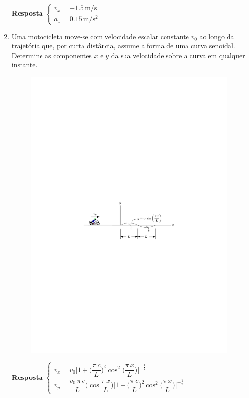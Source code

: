 \documentclass[a4paper,12pt]{article}
\begin{document}
\begin{enumerate}
		\textbf{Resposta}
		$
		\begin{cases}
		v_{x}=\SI{-1.5}{\meter/\second}\\
		a_{x}=\SI{0.15}{\meter/\second^{2}}
		\end{cases}
		$
		
		\item Uma motocicleta move-se com velocidade escalar constante $v_{0}$ ao longo da trajetória que, por curta distância, assume a forma de uma curva senoidal. Determine as componentes $x$ e $y$ da sua velocidade
		sobre a curva em qualquer instante.
		
		\begin{figure}[h!]
			\centering
			\includegraphics[scale=1.2]{images/draw_3}
		\end{figure}
		
		\textbf{Resposta}
		$
		\begin{cases}
		v_{x}=v_{0}\bigg[1+\bigg(\dfrac{\pi\,c}{L}\bigg)^{2}\cos^{2}\bigg(\dfrac{\pi\,x}{L}\bigg)\bigg]^{-\frac{1}{2}}\\
		v_{y}=\dfrac{v_{0}\,\pi\,c}{L}\bigg(\cos\dfrac{\pi\,x}{L}\bigg)\bigg[1+\bigg(\dfrac{\pi\,c}{L}\bigg)^{2}\cos^{2}\bigg(\dfrac{\pi\,x}{L}\bigg)\bigg]^{-\frac{1}{2}}
		\end{cases}
		$
		

\end{enumerate}
\end{document}
